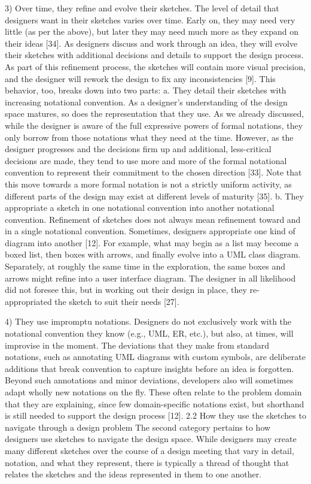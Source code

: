 3)	Over time, they refine and evolve their sketches. The level of detail that designers want in their sketches varies over time. Early on, they may need very little (as per the above), but later they may need much more as they expand on their ideas [34]. As designers discuss and work through an idea, they will evolve their sketches with additional decisions and details to support the design process. As part of this refinement process, the sketches will contain more visual precision, and the designer will rework the design to fix any inconsistencies [9]. This behavior, too, breaks down into two parts:
a.	They detail their sketches with increasing notational convention. As a designer’s understanding of the design space matures, so does the representation that they use. As we already discussed, while the designer is aware of the full expressive powers of formal notations, they only borrow from those notations what they need at the time. However, as the designer progresses and the decisions firm up and additional, less-critical decisions are made, they tend to use more and more of the formal notational convention to represent their commitment to the chosen direction [33]. Note that this move towards a more formal notation is not a strictly uniform activity, as different parts of the design may exist at different levels of maturity [35].
b.	They appropriate a sketch in one notational convention into another notational convention. Refinement of sketches does not always mean refinement toward and in a single notational convention. Sometimes, designers appropriate one kind of diagram into another [12]. For example, what may begin as a list may become a boxed list, then boxes with arrows, and finally evolve into a UML class diagram. Separately, at roughly the same time in the exploration, the same boxes and arrows might refine into a user interface diagram. The designer in all likelihood did not foresee this, but in working out their design in place, they re-appropriated the sketch to suit their needs [27]. 

4)	They use impromptu notations. Designers do not exclusively work with the notational convention they know (e.g., UML, ER, etc.), but also, at times, will improvise in the moment. The deviations that they make from standard notations, such as annotating UML diagrams with custom symbols, are deliberate additions that break convention to capture insights before an idea is forgotten. Beyond such annotations and minor deviations, developers also will sometimes adapt wholly new notations on the fly. These often relate to the problem domain that they are explaining, since few domain-specific notations exist, but shorthand is still needed to support the design process [12]. 
2.2	How they use the sketches to navigate through a design problem
The second category pertains to how designers use sketches to navigate the design space. While designers may create many different sketches over the course of a design meeting that vary in detail, notation, and what they represent, there is typically a thread of thought that relates the sketches and the ideas represented in them to one another. 

